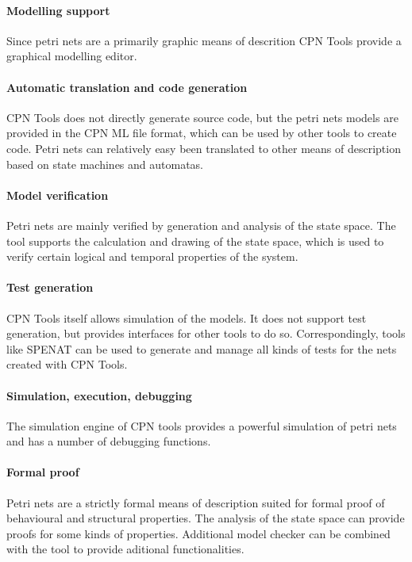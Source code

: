 \paragraph{Modelling support}
Since petri nets are a primarily graphic means of descrition CPN Tools provide a graphical modelling editor.

\paragraph{Automatic translation and code generation}
CPN Tools does not directly generate source code, but the petri nets models are provided in the CPN ML file format, which can be used by other tools to create code. Petri nets can relatively easy been translated to other means of description based on state machines and automatas. 

\paragraph{Model verification}
Petri nets are mainly verified by generation and analysis of the state space. The tool supports the calculation and drawing of the state space, which is used to verify certain logical and temporal properties of the system.

\paragraph{Test generation}
CPN Tools itself allows simulation of the models. It does not support test generation, but provides interfaces for other tools to do so. Correspondingly, tools like SPENAT can be used to generate and manage all kinds of tests for the nets created with CPN Tools.

\paragraph{Simulation, execution, debugging}
The simulation engine of CPN tools provides a powerful simulation of petri nets and has a number of debugging functions.

\paragraph{Formal proof}
Petri nets are a strictly formal means of description suited for formal proof of behavioural and structural properties. The analysis of the state space can provide proofs for some kinds of properties. Additional model checker can be combined with the tool to provide aditional functionalities.



